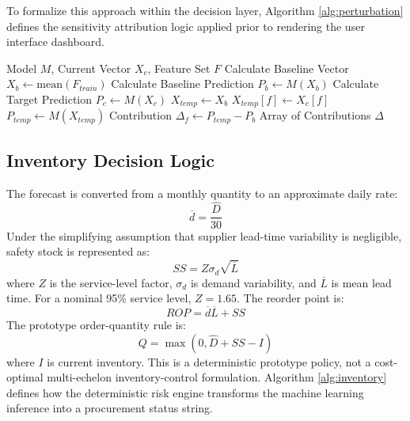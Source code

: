 \documentclass[9pt,conference]{IEEEtran}
\providecommand{\syscite}[1]{}
\begin{document}
To formalize this approach within the decision layer, Algorithm \ref{alg:perturbation} defines the sensitivity attribution logic applied prior to rendering the user interface dashboard.

\begin{algorithm}
\scriptsize
\caption{Baseline Perturbation Feature Sensitivity}
\label{alg:perturbation}
\begin{algorithmic}[1]
\REQUIRE Model $M$, Current Vector $X_c$, Feature Set $F$
\STATE Calculate Baseline Vector $X_b \leftarrow \text{mean}(F_{train})$
\STATE Calculate Baseline Prediction $P_b \leftarrow M(X_b)$
\STATE Calculate Target Prediction $P_c \leftarrow M(X_c)$
    \STATE $X_{temp} \leftarrow X_b$
    \STATE $X_{temp}[f] \leftarrow X_c[f]$
    \STATE $P_{temp} \leftarrow M(X_{temp})$
    \STATE Contribution $\Delta_f \leftarrow P_{temp} - P_b$
\ENDFOR
\RETURN Array of Contributions $\Delta$
\end{algorithmic}
\end{algorithm}

\subsection{Inventory Decision Logic}
The forecast is converted from a monthly quantity to an approximate daily rate: \syscite{[cite: 1]}
\begin{equation}
\overline{d} = \frac{\hat{D}}{30}
\end{equation}
Under the simplifying assumption that supplier lead-time variability is negligible, safety stock is represented as: \syscite{[cite: 1]}
\begin{equation}
SS = Z \sigma_{d} \sqrt{\overline{L}}
\end{equation}
where $Z$ is the service-level factor, $\sigma_{d}$ is demand variability, and $\overline{L}$ is mean lead time. \syscite{[cite: 1]} For a nominal 95\% service level, $Z=1.65$. \syscite{[cite: 1]} The reorder point is: \syscite{[cite: 1]}
\begin{equation}
ROP = \overline{d} \overline{L} + SS
\end{equation}
The prototype order-quantity rule is: \syscite{[cite: 1]}
\begin{equation}
Q = \max(0, \hat{D} + SS - I)
\end{equation}
where $I$ is current inventory. \syscite{[cite: 1]} This is a deterministic prototype policy, not a cost-optimal multi-echelon inventory-control formulation. \syscite{[cite: 1]} Algorithm \ref{alg:inventory} defines how the deterministic risk engine transforms the machine learning inference into a procurement status string.
\end{document}
